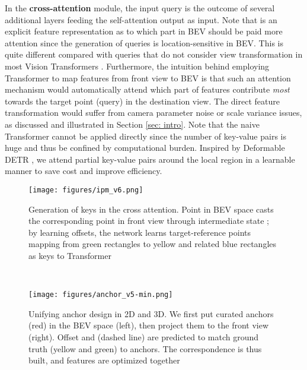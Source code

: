 \documentclass[runningheads]{llncs}
\begin{document}
In the \textbf{cross-attention} module, the input query  is the outcome of several additional layers feeding the self-attention output  as input.
{Note that  is an explicit feature representation as to which part in BEV should be paid more attention since the generation of queries is location-sensitive in BEV.}
This is quite different compared with 
queries 
{that do not consider view transformation} 
in most Vision Transformers \cite{wang2022detr3d,guan2022m3detr,zhu2021deformable}. 
Furthermore,
the intuition behind employing Transformer to map features from front view to BEV is that such an attention mechanism would automatically attend which part of features contribute \textit{most} towards the {target point (query) in the destination view.}
The direct feature transformation would suffer from camera parameter noise or scale variance issues, as discussed and illustrated in Section \ref{sec: intro}.
Note that the naive Transformer cannot be applied directly since the number of key-value pairs is huge and thus be confined by computational burden.
Inspired by Deformable DETR \cite{zhu2021deformable}, we attend partial key-value pairs around the local region in a learnable manner to save cost and improve efficiency.




\begin{figure}[t]
\begin{minipage}[b]{.49\textwidth}
  \centering
  \texttt{[image: figures/ipm\_v6.png]}
  \caption{
 Generation of keys in the cross attention. 
 Point  in BEV space casts the corresponding point  in front view through intermediate state ; by learning offsets,
the network learns target-reference points mapping
 {from green rectangles to yellow and related blue rectangles}
 as keys to Transformer
}
  \label{fig:transformer} 
\end{minipage}
~~~~
\begin{minipage}[b]{.49\textwidth}
  \centering
  \texttt{[image: figures/anchor\_v5-min.png]}
   \caption{Unifying anchor design in 2D and 3D. 
We first put curated anchors (red) in the BEV space (left), then project them to the front view (right). Offset  and  (dashed line) are predicted to match ground truth (yellow and green) to anchors. The correspondence is thus built, and features are optimized together
}
  \label{fig:anchor} 
\end{minipage}
\end{figure}
\end{document}
